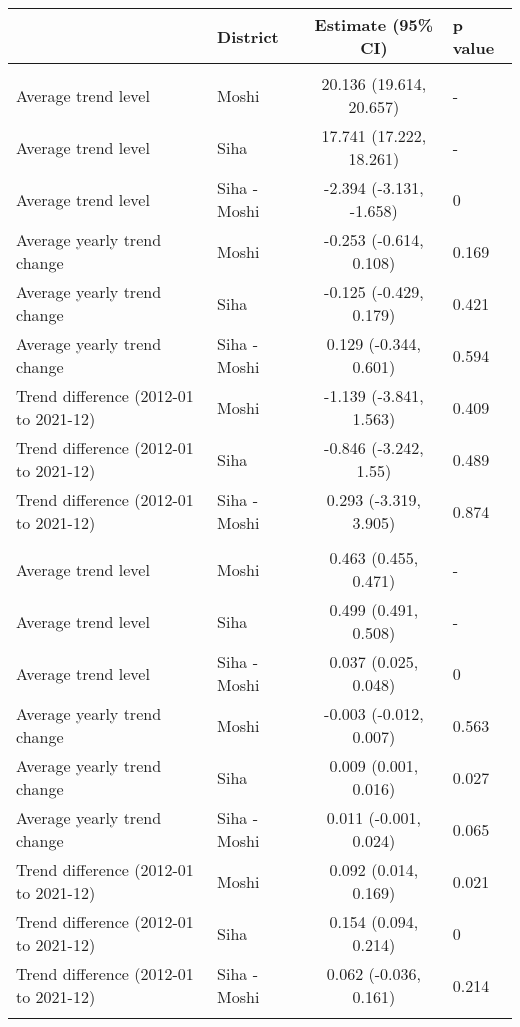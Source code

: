 \begin{longtable}{l|lcl}
\toprule
\multicolumn{1}{l}{} & District & Estimate (95\% CI) & p value \\ 
\midrule\addlinespace[2.5pt]
\multicolumn{4}{l}{PM2.5 (μg/m³)} \\ 
\midrule\addlinespace[2.5pt]
Average trend level & Moshi & 20.136 (19.614, 20.657) & - \\ 
Average trend level & Siha & 17.741 (17.222, 18.261) & - \\ 
Average trend level & Siha - Moshi & -2.394 (-3.131, -1.658) & 0 \\ 
Average yearly trend change & Moshi & -0.253 (-0.614, 0.108) & 0.169 \\ 
Average yearly trend change & Siha & -0.125 (-0.429, 0.179) & 0.421 \\ 
Average yearly trend change & Siha - Moshi & 0.129 (-0.344, 0.601) & 0.594 \\ 
Trend difference (2012-01 to 2021-12) & Moshi & -1.139 (-3.841, 1.563) & 0.409 \\ 
Trend difference (2012-01 to 2021-12) & Siha & -0.846 (-3.242, 1.55) & 0.489 \\ 
Trend difference (2012-01 to 2021-12) & Siha - Moshi & 0.293 (-3.319, 3.905) & 0.874 \\ 
\midrule\addlinespace[2.5pt]
\multicolumn{4}{l}{Greenness (NDVI)} \\ 
\midrule\addlinespace[2.5pt]
Average trend level & Moshi & 0.463 (0.455, 0.471) & - \\ 
Average trend level & Siha & 0.499 (0.491, 0.508) & - \\ 
Average trend level & Siha - Moshi & 0.037 (0.025, 0.048) & 0 \\ 
Average yearly trend change & Moshi & -0.003 (-0.012, 0.007) & 0.563 \\ 
Average yearly trend change & Siha & 0.009 (0.001, 0.016) & 0.027 \\ 
Average yearly trend change & Siha - Moshi & 0.011 (-0.001, 0.024) & 0.065 \\ 
Trend difference (2012-01 to 2021-12) & Moshi & 0.092 (0.014, 0.169) & 0.021 \\ 
Trend difference (2012-01 to 2021-12) & Siha & 0.154 (0.094, 0.214) & 0 \\ 
Trend difference (2012-01 to 2021-12) & Siha - Moshi & 0.062 (-0.036, 0.161) & 0.214 \\ 
\midrule\addlinespace[2.5pt]
\multicolumn{4}{l}{Min. temp. (ºC)} \\ 

\end{longtable}
